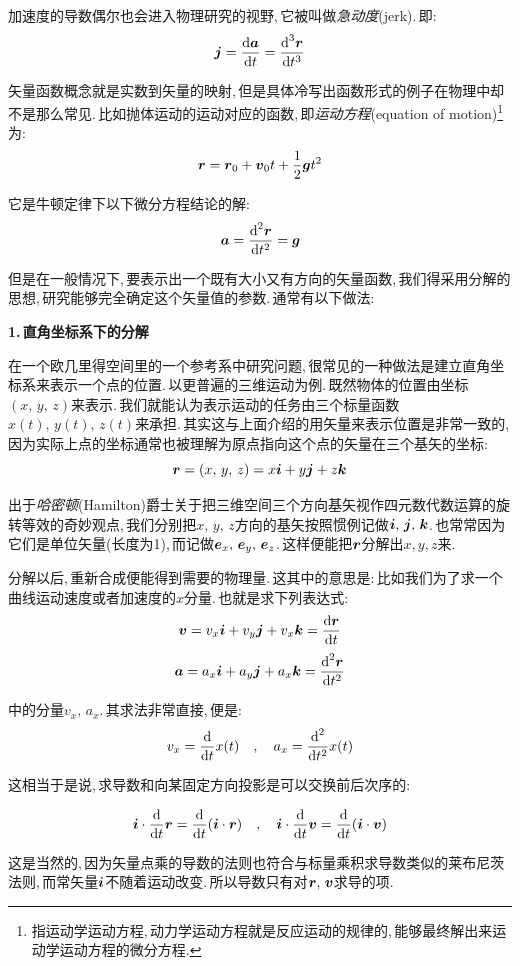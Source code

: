 加速度的导数偶尔也会进入物理研究的视野,\,它被叫做\emph{急动度}(jerk).\,即:
\[\boldsymbol{j}=\frac{\textrm{d} \boldsymbol{a}}{\textrm{d} t}=\frac{\textrm{d} ^3\boldsymbol{r}}{\textrm{d} t^3}\]

矢量函数概念就是实数到矢量的映射,\,但是具体冷写出函数形式的例子在物理中却不是那么常见.\,比如抛体运动的运动对应的函数,\,即\emph{运动方程}(equation of motion)\footnote{指运动学运动方程,\,动力学运动方程就是反应运动的规律的,\,能够最终解出来运动学运动方程的微分方程.}为:
\[\boldsymbol{r}=\boldsymbol{r}_0+\boldsymbol{v}_0 t+\frac{1}{2}\boldsymbol{g}t^2\]

它是牛顿定律下以下微分方程结论的解:
\[\boldsymbol{a}=\frac{\textrm{d} ^2\boldsymbol{r}}{\textrm{d} t^2}=\boldsymbol{g}\]

但是在一般情况下,\,要表示出一个既有大小又有方向的矢量函数,\,我们得采用分解的思想,\,研究能够完全确定这个矢量值的参数.\,通常有以下做法:

\vspace{0.2cm}
{\bf 1.\,直角坐标系下的分解}

在一个欧几里得空间里的一个参考系中研究问题,\,很常见的一种做法是建立直角坐标系来表示一个点的位置.\,以更普遍的三维运动为例.\,既然物体的位置由坐标$(x,\,y,\,z)$来表示.\,我们就能认为表示运动的任务由三个标量函数$x(t),\,y(t),\,z(t)$来承担.\,其实这与上面介绍的用矢量来表示位置是非常一致的,\,因为实际上点的坐标通常也被理解为原点指向这个点的矢量在三个基矢的坐标:
\[\boldsymbol{r}=(x,\,y,\,z)=x\boldsymbol{i}+y\boldsymbol{j}+z\boldsymbol{k}\]

出于\emph{哈密顿}(Hamilton)爵士关于把三维空间三个方向基矢视作四元数代数运算的旋转等效的奇妙观点,\,我们分别把$x,\,y,\,z$方向的基矢按照惯例记做$\boldsymbol{i},\,\boldsymbol{j},\,\boldsymbol{k}$.\,也常常因为它们是单位矢量(长度为1),\,而记做$\boldsymbol{e}_x,\,\boldsymbol{e}_y,\,\boldsymbol{e}_z$.\,这样便能把$\boldsymbol{r}$分解出$x$,\,$y$,\,$z$来.

分解以后,\,重新合成便能得到需要的物理量.\,这其中的意思是:\,比如我们为了求一个曲线运动速度或者加速度的$x$分量.\,也就是求下列表达式:
\[\boldsymbol{v}=v_x\boldsymbol{i}+v_y\boldsymbol{j}+v_x\boldsymbol{k}=\frac{\textrm{d} \boldsymbol{r}}{\textrm{d} t}\]
\[\boldsymbol{a}=a_x\boldsymbol{i}+a_y\boldsymbol{j}+a_x\boldsymbol{k}=\frac{\textrm{d}^2 \boldsymbol{r}}{\textrm{d} t^2}\]

中的分量$v_x,\,a_x$.\,其求法非常直接,\,便是:
\[v_x=\frac{\textrm{d} }{\textrm{d} t}x(t)\quad,\quad a_x=\frac{\textrm{d}^2 }{\textrm{d} t^2}x(t)\]

这相当于是说,\,求导数和向某固定方向投影是可以交换前后次序的:

\[\boldsymbol{i}\cdot \frac{\textrm{d} }{\textrm{d} t}\boldsymbol{r}=\frac{\textrm{d} }{\textrm{d} t}(\boldsymbol{i}\cdot \boldsymbol{r})\quad,\quad \boldsymbol{i}\cdot \frac{\textrm{d} }{\textrm{d} t}\boldsymbol{v}=\frac{\textrm{d} }{\textrm{d} t}(\boldsymbol{i}\cdot \boldsymbol{v})\]

这是当然的,\,因为矢量点乘的导数的法则也符合与标量乘积求导数类似的莱布尼茨法则,\,而常矢量$\boldsymbol{i}$不随着运动改变.\,所以导数只有对$\boldsymbol{r},\,\boldsymbol{v}$求导的项.

